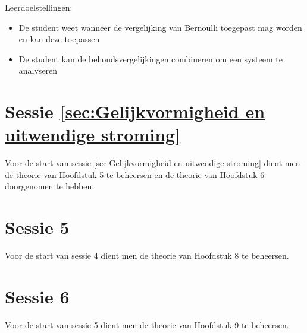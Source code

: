 Leerdoelstellingen:
\begin{itemize}
	\item De student weet wanneer de vergelijking van Bernoulli toegepast mag worden en kan deze toepassen
	\item De student kan de behoudsvergelijkingen combineren om een systeem te analyseren
\end{itemize}

	\section*{Sessie \ref{sec:Gelijkvormigheid en uitwendige stroming}}
Voor de start van sessie \ref{sec:Gelijkvormigheid en uitwendige stroming} dient men de theorie van Hoofdstuk 5 te beheersen en de theorie van Hoofdstuk 6 doorgenomen te hebben.

	\section*{Sessie 5}
Voor de start van sessie 4 dient men de theorie van Hoofdstuk 8 te beheersen.
	
	\section*{Sessie 6}
Voor de start van sessie 5 dient men de theorie van Hoofdstuk 9 te beheersen.
